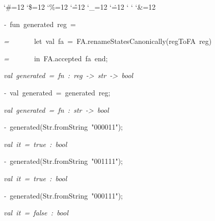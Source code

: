 \begin{list}{}
{\setlength{\leftmargin}{\leftmargini}
\setlength{\rightmargin}{0cm}
\setlength{\itemindent}{0cm}
\setlength{\listparindent}{0cm}
\setlength{\itemsep}{0cm}
\setlength{\parsep}{0cm}
\setlength{\labelsep}{0cm}
\setlength{\labelwidth}{0cm}
\catcode`\#=12
\catcode`\$=12
\catcode`\%=12
\catcode`\^=12
\catcode`\_=12
\catcode`\.=12
\catcode`
\catcode`
\catcode`\&=12
\ttfamily}
\small
\item[]\textsl{-\ }fun\ generated\ reg\ =
\item[]\textsl{=\ }\ \ \ \ \ \ let\ val\ fa\ =\ FA.renameStatesCanonically(regToFA\ reg)
\item[]\textsl{=\ }\ \ \ \ \ \ in\ FA.accepted\ fa\ end;
\item[]\textsl{val\ generated\ =\ fn\ :\ reg\ ->\ str\ ->\ bool}
\item[]\textsl{-\ }val\ generated\ =\ generated\ reg;
\item[]\textsl{val\ generated\ =\ fn\ :\ str\ ->\ bool}
\item[]\textsl{-\ }generated(Str.fromString\ "000011");
\item[]\textsl{val\ it\ =\ true\ :\ bool}
\item[]\textsl{-\ }generated(Str.fromString\ "001111");
\item[]\textsl{val\ it\ =\ true\ :\ bool}
\item[]\textsl{-\ }generated(Str.fromString\ "000111");
\item[]\textsl{val\ it\ =\ false\ :\ bool}
\end{list}
